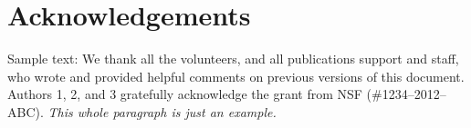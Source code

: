 \documentclass{sigchi}
\begin{document}
\section{Acknowledgements}

Sample text: We thank all the volunteers, and all publications support
and staff, who wrote and provided helpful comments on previous
versions of this document. Authors 1, 2, and 3 gratefully acknowledge
the grant from NSF (\#1234--2012--ABC). \textit{This whole paragraph is
  just an example.}

%
%
%
%
%
\balance{}

\balance{}



\end{document}
